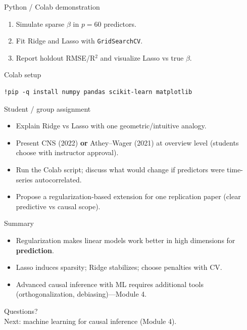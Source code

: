 \documentclass[aspectratio=169,11pt]{beamer}
\begin{document}
\begin{frame}{Python / Colab demonstration}
  \begin{enumerate}
    \item Simulate sparse \(\beta\) in \(p=60\) predictors.
    \item Fit Ridge and Lasso with \texttt{GridSearchCV}.
    \item Report holdout RMSE/R\(^2\) and visualize Lasso vs true \(\beta\).
  \end{enumerate}
\end{frame}

\begin{frame}[fragile]{Colab setup}
  \begin{verbatim}
!pip -q install numpy pandas scikit-learn matplotlib
  \end{verbatim}
\end{frame}

\begin{frame}{Student / group assignment}
  \begin{itemize}
    \item Explain Ridge vs Lasso with one geometric/intuitive analogy.
    \item Present CNS (2022) \textbf{or} Athey--Wager (2021) at overview level (students choose with instructor approval).
    \item Run the Colab script; discuss what would change if predictors were time-series autocorrelated.
    \item Propose a regularization-based extension for one replication paper (clear predictive vs causal scope).
  \end{itemize}
\end{frame}

\begin{frame}{Summary}
  \begin{itemize}
    \item Regularization makes linear models work better in high dimensions for \textbf{prediction}.
    \item Lasso induces sparsity; Ridge stabilizes; choose penalties with CV.
    \item Advanced causal inference with ML requires additional tools (orthogonalization, debiasing)---Module 4.
  \end{itemize}
\end{frame}

\begin{frame}[plain]
  \begin{center}
    \Large Questions?\\[0.8em]
    \normalsize Next: machine learning for causal inference (Module 4).
  \end{center}
\end{frame}
\end{document}
